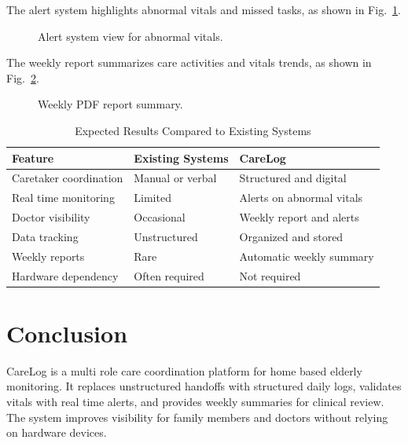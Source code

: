 \documentclass[conference]{IEEEtran}
\begin{document}
The alert system highlights abnormal vitals and missed tasks, as shown in Fig.~\ref{fig:alerts}.

\begin{figure}[htbp]
\centering
{}
\caption{Alert system view for abnormal vitals.}
\label{fig:alerts}
\end{figure}

The weekly report summarizes care activities and vitals trends, as shown in Fig.~\ref{fig:weekly}.

\begin{figure}[htbp]
\centering
{}
\caption{Weekly PDF report summary.}
\label{fig:weekly}
\end{figure}

\begin{table}[htbp]
\caption{Expected Results Compared to Existing Systems}
\begin{center}
\begin{tabular}{|p{2.6cm}|p{2.6cm}|p{2.6cm}|}
\hline
\textbf{Feature} & \textbf{Existing Systems} & \textbf{CareLog} \\
\hline
Caretaker coordination & Manual or verbal & Structured and digital \\
Real time monitoring & Limited & Alerts on abnormal vitals \\
Doctor visibility & Occasional & Weekly report and alerts \\
Data tracking & Unstructured & Organized and stored \\
Weekly reports & Rare & Automatic weekly summary \\
Hardware dependency & Often required & Not required \\
\hline
\end{tabular}
\label{tab:results}
\end{center}
\end{table}

\section{Conclusion}
CareLog is a multi role care coordination platform for home based elderly monitoring. It replaces unstructured handoffs with structured daily logs, validates vitals with real time alerts, and provides weekly summaries for clinical review. The system improves visibility for family members and doctors without relying on hardware devices.
\end{document}
